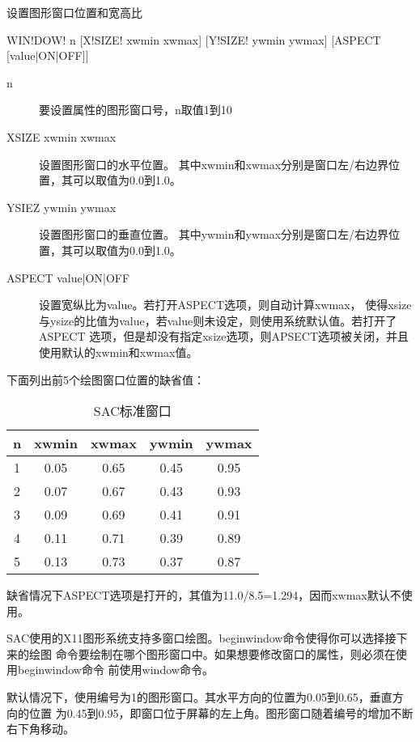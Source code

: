 \label{cmd:window}

设置图形窗口位置和宽高比

\begin{SACSTX}
WIN!DOW! n [X!SIZE! xwmin xwmax]  [Y!SIZE! ywmin ywmax] [ASPECT [value|ON|OFF]]
\end{SACSTX}

\begin{description}
\item [n] 要设置属性的图形窗口号，n取值1到10
\item [XSIZE xwmin xwmax] 设置图形窗口的水平位置。
    其中xwmin和xwmax分别是窗口左/右边界位置，其可以取值为0.0到1.0。
\item [YSIEZ ywmin ywmax] 设置图形窗口的垂直位置。
    其中ywmin和ywmax分别是窗口左/右边界位置，其可以取值为0.0到1.0。
\item [ASPECT value|ON|OFF] 设置宽纵比为value。若打开ASPECT选项，则自动计算xwmax，
    使得xsize与ysize的比值为value，若value则未设定，则使用系统默认值。若打开了ASPECT
    选项，但是却没有指定xsize选项，则APSECT选项被关闭，并且使用默认的xwmin和xwmax值。
\end{description}

下面列出前5个绘图窗口位置的缺省值：
\begin{table}[!ht]
\centering
\caption{SAC标准窗口}
\begin{tabular}{ccccc}
\toprule
 n & xwmin & xwmax & ywmin & ywmax  \\
\midrule
 1 & 0.05  & 0.65  & 0.45  & 0.95 \\
 2 & 0.07  & 0.67  & 0.43  & 0.93 \\
 3 & 0.09  & 0.69  & 0.41  & 0.91 \\
 4 & 0.11  & 0.71  & 0.39  & 0.89 \\
 5 & 0.13  & 0.73  & 0.37  & 0.87 \\
\bottomrule
\end{tabular}
\end{table}

缺省情况下ASPECT选项是打开的，其值为11.0/8.5=1.294，因而xwmax默认不使用。

SAC使用的X11图形系统支持多窗口绘图。beginwindow命令使得你可以选择接下来的绘图
命令要绘制在哪个图形窗口中。如果想要修改窗口的属性，则必须在使用beginwindow命令
前使用window命令。

默认情况下，使用编号为1的图形窗口。其水平方向的位置为0.05到0.65，垂直方向的位置
为0.45到0.95，即窗口位于屏幕的左上角。图形窗口随着编号的增加不断右下角移动。

